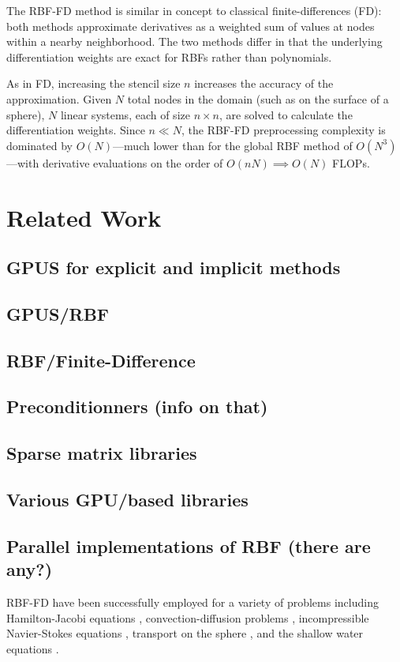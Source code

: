 The RBF-FD method is similar in concept to classical 
finite-differences (FD): both methods approximate derivatives as a weighted sum of values at nodes within a nearby neighborhood. The two methods differ in that the underlying differentiation 
weights are exact for RBFs rather than polynomials. 

As in FD, increasing the stencil size $n$  increases the accuracy of the approximation.
Given $N$ total nodes in the domain (such as on the surface of a sphere), $N$ linear systems, each of size $n \times n$, are solved to calculate the differentiation weights. Since $n \ll N$, the RBF-FD preprocessing complexity is dominated by $O(N)$---much lower than for the global RBF method of $O(N^3)$---with derivative evaluations on the order of $O(nN) \implies O(N)$ FLOPs. 

\section{Related Work}

\subsection{  GPUS for explicit and implicit methods }
\subsection{  GPUS/RBF }
\subsection{  RBF/Finite-Difference }
\subsection{  Preconditionners (info on that) }
\subsection{   Sparse matrix libraries }
\subsection{  Various GPU/based libraries }
\subsection{  Parallel implementations of RBF (there are any?)}

RBF-FD have been successfully employed for a variety of problems including Hamilton-Jacobi equations \cite{Cecil2004}, convection-diffusion problems \cite{Chandhini2007, Stevens2009b},
incompressible Navier-Stokes equations \cite{Shu2003,Chinchapatnam2009}, transport on the sphere \cite{FornbergLehto11}, and the shallow water equations \cite{FlyerLehto11}.

